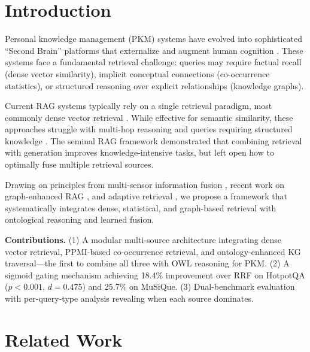 \documentclass[preprint,12pt]{elsarticle}
\begin{document}
\linenumbers

\section{Introduction}
\label{sec:introduction}

Personal knowledge management (PKM) systems have evolved into sophisticated ``Second Brain'' platforms that externalize and augment human cognition \citep{forte2022building,jones2007personal}. These systems face a fundamental retrieval challenge: queries may require factual recall (dense vector similarity), implicit conceptual connections (co-occurrence statistics), or structured reasoning over explicit relationships (knowledge graphs).

Current RAG systems typically rely on a single retrieval paradigm, most commonly dense vector retrieval \citep{izacard2022unsupervised,xiao2023bge}. While effective for semantic similarity, these approaches struggle with multi-hop reasoning and queries requiring structured knowledge \citep{xiong2021answering,gao2024retrieval}. The seminal RAG framework \citep{lewis2020retrieval} demonstrated that combining retrieval with generation improves knowledge-intensive tasks, but left open how to optimally fuse multiple retrieval sources.

Drawing on principles from multi-sensor information fusion \citep{khaleghi2013multisensor,castanedo2013review}, recent work on graph-enhanced RAG \citep{edge2024local,peng2024graph}, and adaptive retrieval \citep{asai2024selfrag,jeong2024adaptive}, we propose a framework that systematically integrates dense, statistical, and graph-based retrieval with ontological reasoning and learned fusion.

\textbf{Contributions.} (1) A modular multi-source architecture integrating dense vector retrieval, PPMI-based co-occurrence retrieval, and ontology-enhanced KG traversal---the first to combine all three with OWL reasoning for PKM. (2) A sigmoid gating mechanism achieving 18.4\% improvement over RRF on HotpotQA ($p<0.001$, $d=0.475$) and 25.7\% on MuSiQue. (3) Dual-benchmark evaluation with per-query-type analysis revealing when each source dominates.

\section{Related Work}
\label{sec:related_work}
\end{document}
